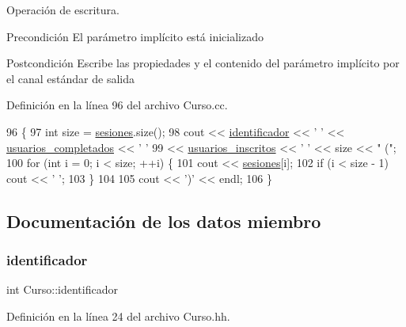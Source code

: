 Operación de escritura. 

\begin{DoxyPrecond}{Precondición}
El parámetro implícito está inicializado 
\end{DoxyPrecond}
\begin{DoxyPostcond}{Postcondición}
Escribe las propiedades y el contenido del parámetro implícito por el canal estándar de salida 
\end{DoxyPostcond}


Definición en la línea 96 del archivo Curso.\+cc.


\begin{DoxyCode}
96                            \{
97   \textcolor{keywordtype}{int} size = \mbox{\hyperlink{class_curso_a53e0e57eb6d683a83752082d633a03bc}{sesiones}}.size();
98   cout << \mbox{\hyperlink{class_curso_aa719041069be2a3f1a093a881ae7a105}{identificador}} << \textcolor{charliteral}{' '} << \mbox{\hyperlink{class_curso_a63f5480299c87c260ba262831ba7a86f}{usuarios\_completados}} << \textcolor{charliteral}{' '}
99   << \mbox{\hyperlink{class_curso_a94c41191b9cd9dc8af95e7d2560a2381}{usuarios\_inscritos}} << \textcolor{charliteral}{' '} << size << \textcolor{stringliteral}{" ("};
100   \textcolor{keywordflow}{for} (\textcolor{keywordtype}{int} i = 0; i < size; ++i) \{
101     cout << \mbox{\hyperlink{class_curso_a53e0e57eb6d683a83752082d633a03bc}{sesiones}}[i];
102     \textcolor{keywordflow}{if} (i < size - 1) cout << \textcolor{charliteral}{' '};
103   \}
104 
105   cout << \textcolor{charliteral}{')'} << endl;
106 \}
\end{DoxyCode}


\subsection{Documentación de los datos miembro}
\mbox{\label{class_curso_aa719041069be2a3f1a093a881ae7a105}} 
\subsubsection{\texorpdfstring{identificador}{identificador}}
{\footnotesize\ttfamily int Curso\+::identificador\hspace{0.3cm}{\ttfamily [private]}}



Definición en la línea 24 del archivo Curso.\+hh.

